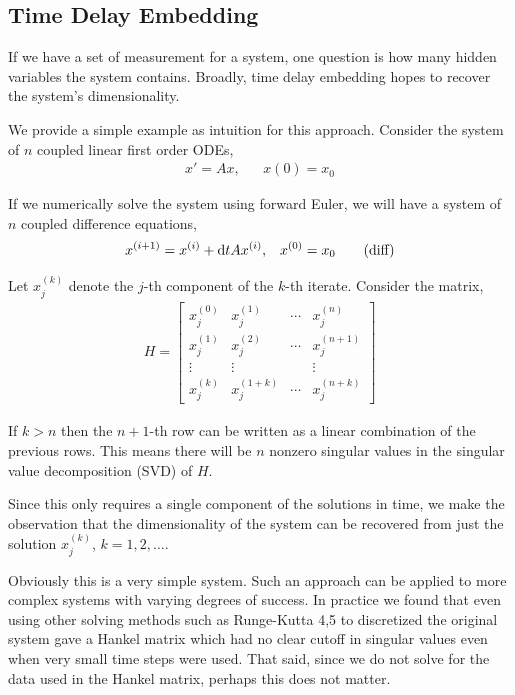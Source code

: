 \documentclass[10pt]{article}
\begin{document}
\subsection{Time Delay Embedding}
If we have a set of measurement for a system, one question is how many hidden variables the system contains.
Broadly, time delay embedding hopes to recover the system's dimensionality.

We provide a simple example as intuition for this approach.
Consider the system of \( n \) coupled linear first order ODEs,
\begin{align}
    x' = Ax, && x(0) = x_0 \tag{ode}
\end{align}

If we numerically solve the system using forward Euler, we will have a system of \( n \) coupled difference equations,
\begin{align*}
    x^{(i+1)} = x^{(i)} + \mathrm{d} t Ax^{(i)}, && x^{(0)} = x_0 \tag{diff}
\end{align*}

Let \( x_j^{(k)} \) denote the \( j \)-th component of the \( k \)-th iterate. Consider the matrix,
\begin{align*}
    H = \left[\begin{array}{llll}
      x_j^{(0)} & x_j^{(1)} & \cdots & x_j^{(n)} \\
      x_j^{(1)} & x_j^{(2)} & \cdots & x_j^{(n+1)} \\
      \vdots & \vdots & & \vdots \\
      x_j^{(k)} & x_j^{(1+k)} & \cdots & x_j^{(n+k)}
    \end{array}\right]
\end{align*}

If \( k>n \) then the \( n+1 \)-th row can be written as a linear combination of the previous rows. This means there will be \( n \) nonzero singular values in the singular value decomposition (SVD) of \( H \).

Since this only requires a single component of the solutions in time, we make the observation that the dimensionality of the system can be recovered from just the solution \( x_j^{(k)} \), \( k=1,2,\ldots \).

Obviously this is a very simple system. Such an approach can be applied to more complex systems with varying degrees of success. In practice we found that even using other solving methods such as Runge-Kutta 4,5 to discretized the original system gave a Hankel matrix which had no clear cutoff in singular values even when very small time steps were used. That said, since we do not solve for the data used in the Hankel matrix, perhaps this does not matter.
\end{document}
